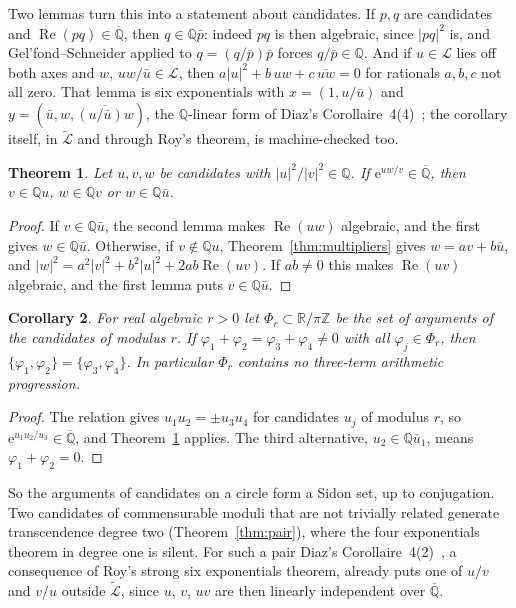 \documentclass[11pt,a4paper]{article}
\theoremstyle{plain}
\newtheorem{theorem}{Theorem}[section]
\newtheorem{corollary}[theorem]{Corollary}
\theoremstyle{definition}
\newcommand{\e}{\mathrm{e}}
\newcommand{\Q}{\mathbb{Q}}
\newcommand{\R}{\mathbb{R}}
\newcommand{\Z}{\mathbb{Z}}
\newcommand{\Alg}{\overline{\mathbb{Q}}}
\newcommand{\Logs}{\mathcal{L}}
\newcommand{\aLogs}{\widetilde{\mathcal{L}}}
\begin{document}
Two lemmas turn this into a statement about candidates. If $p,q$ are candidates and
$\operatorname{Re}(pq)\in\Alg$, then $q\in\Q\bar p$: indeed $pq$ is then algebraic, since
$|pq|^{2}$ is, and Gel'fond--Schneider applied to $q=(q/\bar p)\bar p$ forces $q/\bar p\in\Q$. And if
$u\in\Logs$ lies off both axes and $w,\,uw/\bar u\in\Logs$, then
$a|u|^{2}+b\,uw+c\,\overline{uw}=0$ for rationals $a,b,c$ not all zero. That lemma is six
exponentials with $x=(1,u/\bar u)$ and $y=(\bar u,w,\overline{(u/\bar u)w})$, the $\Q$-linear form
of Diaz's Corollaire~4(4)~\cite{diaz-2007}; the corollary itself, in $\aLogs$ and through Roy's
theorem, is machine-checked too.

\begin{theorem}\label{thm:quotient}
Let $u,v,w$ be candidates with $|u|^{2}/|v|^{2}\in\Q$. If $\e^{uw/v}\in\Alg$, then $v\in\Q u$,
$w\in\Q v$ or $w\in\Q\bar u$.
\end{theorem}

\begin{proof}
If $v\in\Q\bar u$, the second lemma makes $\operatorname{Re}(uw)$ algebraic, and the first gives
$w\in\Q\bar u$. Otherwise, if $v\notin\Q u$, Theorem~\ref{thm:multipliers} gives
$w=av+b\bar u$, and $|w|^{2}=a^{2}|v|^{2}+b^{2}|u|^{2}+2ab\operatorname{Re}(uv)$. If $ab\neq0$ this
makes $\operatorname{Re}(uv)$ algebraic, and the first lemma puts $v\in\Q\bar u$.
\end{proof}

\begin{corollary}\label{cor:sidon}
For real algebraic $r>0$ let $\Phi_{r}\subset\R/\pi\Z$ be the set of arguments of the candidates
of modulus $r$. If $\varphi_{1}+\varphi_{2}=\varphi_{3}+\varphi_{4}\neq0$ with all
$\varphi_{j}\in\Phi_{r}$, then $\{\varphi_{1},\varphi_{2}\}=\{\varphi_{3},\varphi_{4}\}$. In
particular $\Phi_{r}$ contains no three-term arithmetic progression.
\end{corollary}

\begin{proof}
The relation gives $u_{1}u_{2}=\pm u_{3}u_{4}$ for candidates $u_{j}$ of modulus $r$, so
$\e^{u_{1}u_{2}/u_{3}}\in\Alg$, and Theorem~\ref{thm:quotient} applies. The third alternative,
$u_{2}\in\Q\bar u_{1}$, means $\varphi_{1}+\varphi_{2}=0$.
\end{proof}

So the arguments of candidates on a circle form a Sidon set, up to conjugation. Two candidates
of commensurable moduli that are not trivially related generate transcendence degree two
(Theorem~\ref{thm:pair}), where the four exponentials theorem in degree one is silent. For such
a pair Diaz's Corollaire~4(2)~\cite{diaz-2007}, a consequence of Roy's strong six exponentials
theorem, already puts one of $u/v$ and $v/u$ outside $\aLogs$, since $u$, $v$, $uv$ are then
linearly independent over $\Alg$.
\end{document}
